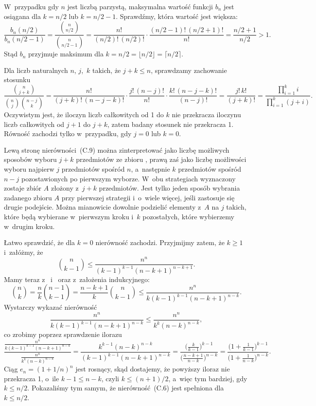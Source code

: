 W~przypadku gdy $n$ jest liczbą parzystą, maksymalna wartość funkcji $b_n$ jest osiągana dla $k=n/2$ lub $k=n/2-1$. Sprawdźmy, która wartość jest większa:
\[
    \frac{b_n(n/2)}{b_n(n/2-1)} = \frac{\binom{n}{n/2}}{\binom{n}{n/2-1}} = \frac{n!}{(n/2)!\,(n/2)!}\cdot\frac{(n/2-1)!\,(n/2+1)!}{n!} = \frac{n/2+1}{n/2} > 1.
\]
Stąd $b_n$ przyjmuje maksimum dla $k=n/2=\lfloor n/2\rfloor=\lceil n/2\rceil$.

\exercise %
Dla liczb naturalnych $n$, $j$,~$k$ takich, że $j+k\le n$, sprawdzamy zachowanie stosunku
\[
	\frac{\binom{n}{j+k}}{\binom{n}{j}\binom{n-j}{k}} = \frac{n!}{(j+k)!\,(n-j-k)!}\cdot\frac{j!\,(n-j)!}{n!}\cdot\frac{k!\,(n-j-k)!}{(n-j)!} = \frac{j!\,k!}{(j+k)!} = \frac{\prod_{i=1}^ki}{\prod_{i=1}^k(j+i)}.
\]
Oczywistym jest, że iloczyn liczb całkowitych od 1 do $k$ nie przekracza iloczynu liczb całkowitych od $j+1$ do $j+k$, zatem badany stosunek nie przekracza 1. Równość zachodzi tylko w~przypadku, gdy $j=0$ lub $k=0$.

Lewą stronę nierówności~(C.9) można zinterpretować jako liczbę możliwych sposobów wyboru $j+k$ przedmiotów ze zbioru , prawą zaś jako liczbę możliwości wyboru najpierw $j$ przedmiotów spośród $n$, a~następnie $k$ przedmiotów spośród $n-j$ pozostawionych po pierwszym wyborze. W~obu strategiach wyznaczony zostaje zbiór $A$ złożony z~$j+k$ przedmiotów. Jest tylko jeden sposób wybrania zadanego zbioru $A$ przy pierwszej strategii i~o~wiele więcej, jeśli zastosuje się drugie podejście. Można mianowicie dowolnie podzielić elementy z~$A$ na $j$ takich, które będą wybierane w~pierwszym kroku i~$k$ pozostałych, które wybierzemy w~drugim kroku.

\exercise %
Łatwo sprawdzić, że dla $k=0$ nierówność zachodzi. Przyjmijmy zatem, że $k\ge1$ i~załóżmy, że
\[
	\binom{n}{k-1} \le \frac{n^n}{(k-1)^{k-1}(n-k+1)^{n-k+1}}.
\]
Mamy teraz z~ i~ oraz z~założenia indukcyjnego:
\[
	\binom{n}{k} = \frac{n}{k}\binom{n-1}{k-1} = \frac{n-k+1}{k}\binom{n}{k-1} \le \frac{n^n}{k(k-1)^{k-1}(n-k+1)^{n-k}}.
\]
Wystarczy wykazać nierówność
\[
	\frac{n^n}{k(k-1)^{k-1}(n-k+1)^{n-k}} \le \frac{n^n}{k^k(n-k)^{n-k}},
\]
co zrobimy poprzez sprawdzenie ilorazu
\[
	\frac{\frac{n^n}{k(k-1)^{k-1}(n-k+1)^{n-k}}}{\frac{n^n}{k^k(n-k)^{n-k}}} = \frac{k^{k-1}(n-k)^{n-k}}{(k-1)^{k-1}(n-k+1)^{n-k}} = \frac{\bigl(\frac{k}{k-1}\bigr)^{k-1}}{\bigl(\frac{n-k+1}{n-k}\bigr)^{n-k}} = \frac{\bigl(1+\frac{1}{k-1}\bigr)^{k-1}}{\bigl(1+\frac{1}{n-k}\bigr)^{n-k}}.
\]
Ciąg $e_n={(1+1/n)}^n$ jest rosnący, skąd dostajemy, że powyższy iloraz nie przekracza 1, o~ile $k-1\le n-k$, czyli $k\le(n+1)/2$, a~więc tym bardziej, gdy $k\le n/2$. Pokazaliśmy tym samym, że nierówność~(C.6) jest spełniona dla $k\le n/2$.

